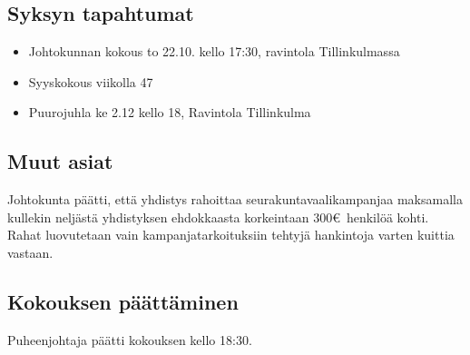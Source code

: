 \documentclass[a4paper,12pt]{article}
\begin{document}
\subsection{Syksyn tapahtumat}
\begin{itemize}
\item{Johtokunnan kokous} to 22.10. kello 17:30, ravintola Tillinkulmassa
\item{Syyskokous} viikolla 47
\item{Puurojuhla} ke 2.12 kello 18, Ravintola Tillinkulma
\end{itemize}
\subsection{Muut asiat}
Johtokunta päätti, että yhdistys rahoittaa seurakuntavaalikampanjaa maksamalla kullekin neljästä yhdistyksen ehdokkaasta korkeintaan 300\euro\ henkilöä kohti. Rahat luovutetaan vain kampanjatarkoituksiin tehtyjä hankintoja varten kuittia vastaan.
\subsection{Kokouksen päättäminen}
Puheenjohtaja päätti kokouksen kello 18:30.
\end{document}
